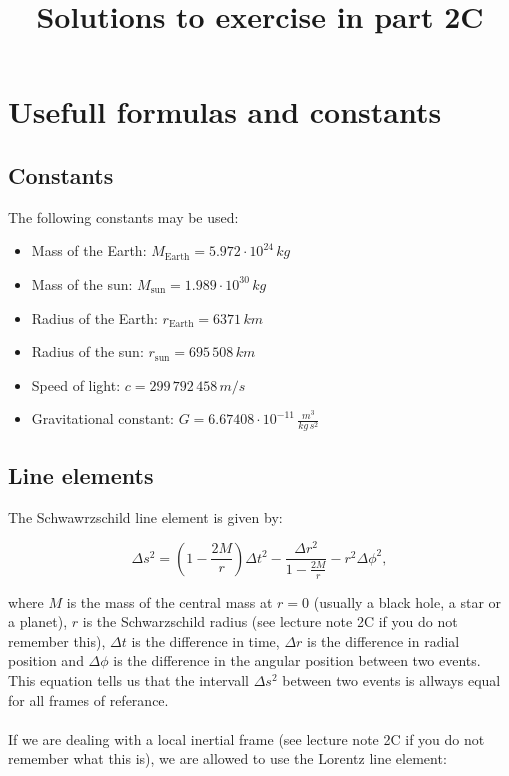 \documentclass[a4paper,10pt,english]{article}
\begin{document}
\title{Solutions to exercise in part 2C}
\date{}
\maketitle
\tableofcontents
\clearpage

\section*{Usefull formulas and constants}

\subsection*{Constants}
The following constants may be used:
\begin{itemize}
\item Mass of the Earth:      $M_{\text{Earth}}=5.972\cdot10^{24}\,kg$ 
\item Mass of the sun:        $M_{\text{sun}}=1.989\cdot10^{30}\,kg$
\item Radius of the Earth:    $r_{\text{Earth}}=6371\,km$
\item Radius of the sun:      $r_{\text{sun}}=695\,508\,km$
\item Speed of light:         $c=299\,792\,458\,m/s$
\item Gravitational constant: $G=6.67408\cdot10^{-11}\,\frac{m^{3}}{kg\,s^{2}}$
\end{itemize}

\subsection*{Line elements}
The Schwawrzschild line element is given by:

\begin{equation}\label{eq:schwarzschild}
\Delta s^{2}=\left(1-\frac{2M}{r}\right)\Delta t^{2}-\frac{\Delta r^{2}}{1-\frac{2M}{r}}-r^{2}\Delta\phi^{2},
\end{equation}

where $M$ is the mass of the central mass at $r=0$ (usually a black hole, a star or a planet), $r$ is the Schwarzschild radius (see lecture note 2C if you do not remember this), $\Delta t$ is the difference in time, $\Delta r$ is the difference in radial position and $\Delta\phi$ is the difference in the angular position between two events.
\\
This equation tells us that the intervall $\Delta s^{2}$ between two events is allways equal for all frames of referance.
\\
\\
If we are dealing with a local inertial frame (see lecture note 2C if you do not remember what this is), we are allowed to use the Lorentz line element:
\end{document}

